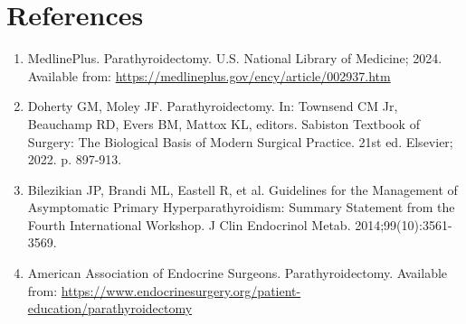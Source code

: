 \section*{References}
\begin{enumerate}
  \item MedlinePlus. Parathyroidectomy. U.S. National Library of Medicine; 2024. Available from: \url{https://medlineplus.gov/ency/article/002937.htm}
  \item Doherty GM, Moley JF. Parathyroidectomy. In: Townsend CM Jr, Beauchamp RD, Evers BM, Mattox KL, editors. Sabiston Textbook of Surgery: The Biological Basis of Modern Surgical Practice. 21st ed. Elsevier; 2022. p. 897-913.
  \item Bilezikian JP, Brandi ML, Eastell R, et al. Guidelines for the Management of Asymptomatic Primary Hyperparathyroidism: Summary Statement from the Fourth International Workshop. J Clin Endocrinol Metab. 2014;99(10):3561-3569.
  \item American Association of Endocrine Surgeons. Parathyroidectomy. Available from: \url{https://www.endocrinesurgery.org/patient-education/parathyroidectomy}
\end{enumerate}

\clearpage
